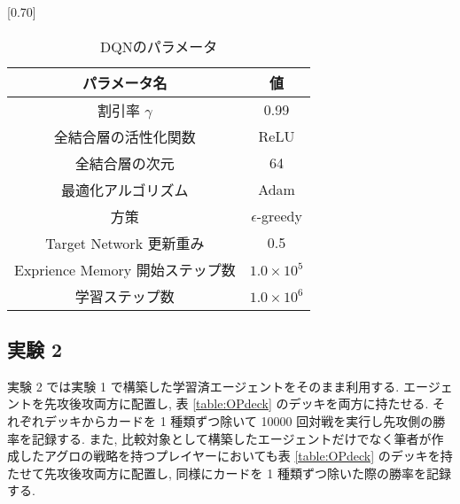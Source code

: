 \documentclass[twocolumn]{jarticle}
\begin{document}
       \begin{table}[t]
         \centering
         \caption{DQNのパラメータ}
         \vspace{-0.3cm}
         \label{table:dqnparam}
         \scalebox{0.70}[0.70]{
           \begin{tabular}{|c|c|}
             \hline
             パラメータ名 & 値 \\ \hline \hline
             割引率 $\gamma$ & 0.99 \\ \hline     
             全結合層の活性化関数             & ReLU     \\ \hline
             全結合層の次元                & 64       \\ \hline
             最適化アルゴリズム              & Adam     \\ \hline
             方策                 & $\epsilon$-greedy \\ \hline
             Target Network 更新重み              & 0.5     \\ \hline
             Exprience Memory 開始ステップ数 & $1.0 \times 10^5$ \\ \hline
             学習ステップ数 &  $1.0 \times 10^6$ \\ \hline
             \end{tabular}
         }
         \end{table}
\subsection{実験 2}
実験 2 では実験 1 で構築した学習済エージェントをそのまま利用する. 
エージェントを先攻後攻両方に配置し, 表 \ref{table:OPdeck} のデッキを両方に持たせる. それぞれデッキからカードを 1 種類ずつ除いて 10000 回対戦を実行し先攻側の勝率を記録する. また, 比較対象として構築したエージェントだけでなく筆者が作成したアグロの戦略を持つプレイヤーにおいても表 \ref{table:OPdeck} のデッキを持たせて先攻後攻両方に配置し, 同様にカードを 1 種類ずつ除いた際の勝率を記録する.
\end{document}
